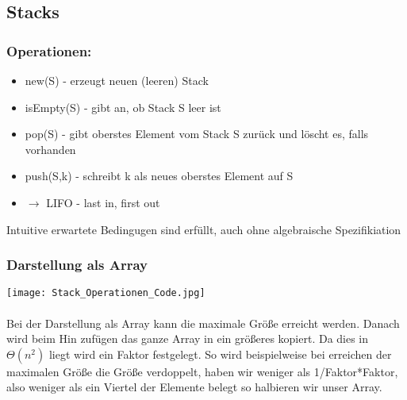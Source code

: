 	\vspace{1.5cm}

	\subsection{Stacks}
		\subsubsection{Operationen:}
			\begin{itemize}
				\item new(S)		- erzeugt neuen (leeren) Stack
				\item isEmpty(S)	- gibt an, ob Stack S leer ist
				\item pop(S)		- gibt oberstes Element vom Stack S zurück und löscht es, falls vorhanden
				\item push(S,k)		- schreibt k als neues oberstes Element auf S
				\item $\longrightarrow$ LIFO - last in, first out
			\end{itemize}
			\begin{center}
				Intuitive erwartete Bedingugen sind erfüllt, auch ohne algebraische Spezifikiation
			\end{center}

		\subsubsection{Darstellung als Array} 
			\begin{center}
				\texttt{[image: Stack\_Operationen\_Code.jpg]}
			\end{center}

			\paragraph{} Bei der Darstellung als Array kann die maximale Grö\ss e erreicht werden. Danach wird beim 
			Hin zufügen das ganze Array in ein größeres kopiert. Da dies in $\Theta (n^2)$ liegt wird ein
			Faktor festgelegt. So wird beispielweise bei erreichen der maximalen Grö\ss e die Grö\ss e
			verdoppelt, haben wir weniger als 1/Faktor*Faktor, also weniger als ein Viertel der Elemente belegt
			so halbieren wir unser Array.


			\vspace{1.5cm}


